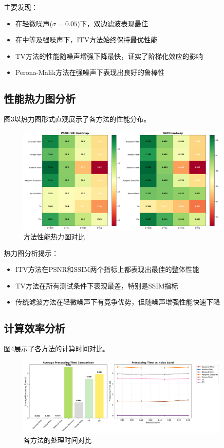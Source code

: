\documentclass[a4paper,12pt]{ctexart}
\begin{document}
主要发现：
\begin{itemize}
    \item 在轻微噪声($\sigma=0.05$)下，双边滤波表现最佳
    \item 在中等及强噪声下，ITV方法始终保持最优性能
    \item TV方法的性能随噪声增强下降最快，证实了阶梯化效应的影响
    \item Perona-Malik方法在强噪声下表现出良好的鲁棒性
\end{itemize}

\subsection{性能热力图分析}

图3以热力图形式直观展示了各方法的性能分布。

\begin{figure}[H]
\centering
\includegraphics[width=0.95\textwidth]{img/multi_noise_analysis_20250609_204619/method_comparison_heatmap.png}
\caption{方法性能热力图对比}
\label{fig:heatmap}
\end{figure}

热力图分析揭示：
\begin{itemize}
    \item ITV方法在PSNR和SSIM两个指标上都表现出最佳的整体性能
    \item TV方法在所有测试条件下表现最差，特别是SSIM指标
    \item 传统滤波方法在轻微噪声下有竞争优势，但随噪声增强性能快速下降
\end{itemize}

\subsection{计算效率分析}

图4展示了各方法的计算时间对比。

\begin{figure}[H]
\centering
\includegraphics[width=0.95\textwidth]{img/multi_noise_analysis_20250609_204619/processing_time_comparison.png}
\caption{各方法的处理时间对比}
\label{fig:timing}
\end{figure}
\end{document}
